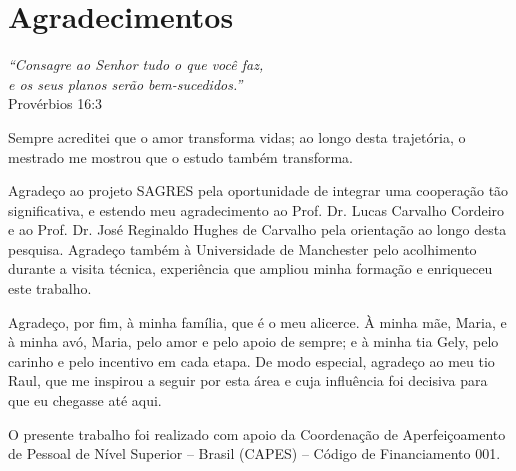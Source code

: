 \frontmatter

\chapter*{Agradecimentos}

\begin{flushright}
\begin{minipage}{0.62\textwidth}
\raggedleft
\textit{``Consagre ao Senhor tudo o que você faz,\\
e os seus planos serão bem-sucedidos.''}\\[1mm]
Provérbios 16:3
\end{minipage}
\end{flushright}

\vspace{1mm}

Sempre acreditei que o amor transforma vidas; ao longo desta trajetória, o
mestrado me mostrou que o estudo também transforma.

Agradeço ao projeto SAGRES pela oportunidade de integrar uma cooperação tão
significativa, e estendo meu agradecimento ao Prof. Dr. Lucas Carvalho Cordeiro
e ao Prof. Dr. José Reginaldo Hughes de Carvalho pela orientação ao longo desta
pesquisa. Agradeço também à Universidade de Manchester pelo acolhimento durante
a visita técnica, experiência que ampliou minha formação e enriqueceu este
trabalho.

Agradeço, por fim, à minha família, que é o meu alicerce. À minha mãe, Maria, e
à minha avó, Maria, pelo amor e pelo apoio de sempre; e à minha tia Gely, pelo
carinho e pelo incentivo em cada etapa. De modo especial, agradeço ao meu tio
Raul, que me inspirou a seguir por esta área e cuja influência foi decisiva para
que eu chegasse até aqui.

O presente trabalho foi realizado com apoio da Coordenação de Aperfeiçoamento de
Pessoal de Nível Superior -- Brasil (CAPES) -- Código de Financiamento 001.

